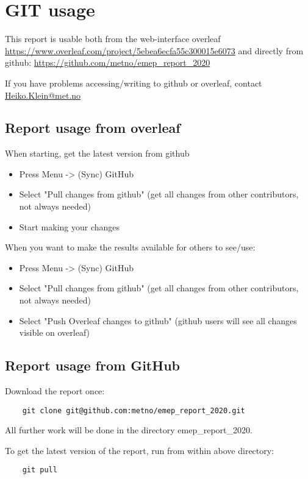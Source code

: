 \chapter{GIT usage}

This report is usable both from the web-interface overleaf \url{https://www.overleaf.com/project/5ebea6ecfa55c300015e6073} and directly from github: \url{https://github.com/metno/emep_report_2020}

If you have problems accessing/writing to github or overleaf, contact \href{mailto:Heiko.Klein@met.no}{Heiko.Klein@met.no}

\section{Report usage from overleaf}

When starting, get the latest version from github
\begin{itemize}
    \item Press Menu -> (Sync) GitHub
    \item Select "Pull changes from github" (get all changes from other contributors, not always needed)
    \item Start making your changes
\end{itemize}

When you want to make the results available for others to see/use:
\begin{itemize}
    \item Press Menu -> (Sync) GitHub
    \item Select "Pull changes from github" (get all changes from other contributors, not always needed)
    \item Select "Push Overleaf changes to github" (github users will see all changes visible on overleaf)
\end{itemize}


\section{Report usage from GitHub}

Download the report once:
\begin{verbatim}
    git clone git@github.com:metno/emep_report_2020.git
\end{verbatim}
All further work will be done in the directory emep\_report\_2020.

To get the latest version of the report, run from within above directory:
\begin{verbatim}
    git pull
\end{verbatim}

